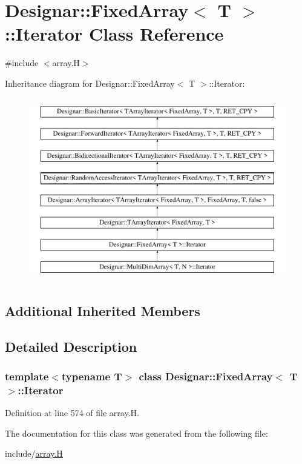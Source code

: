 \hypertarget{class_designar_1_1_fixed_array_1_1_iterator}{}\section{Designar\+:\+:Fixed\+Array$<$ T $>$\+:\+:Iterator Class Reference}
\label{class_designar_1_1_fixed_array_1_1_iterator}


{\ttfamily \#include $<$array.\+H$>$}

Inheritance diagram for Designar\+:\+:Fixed\+Array$<$ T $>$\+:\+:Iterator\+:\begin{figure}[H]
\begin{center}
\leavevmode
\includegraphics[height=8.000000cm]{class_designar_1_1_fixed_array_1_1_iterator}
\end{center}
\end{figure}
\subsection*{Additional Inherited Members}


\subsection{Detailed Description}
\subsubsection*{template$<$typename T$>$\newline
class Designar\+::\+Fixed\+Array$<$ T $>$\+::\+Iterator}



Definition at line 574 of file array.\+H.



The documentation for this class was generated from the following file\+:\begin{DoxyCompactItemize}
\item 
include/\hyperlink{array_8_h}{array.\+H}\end{DoxyCompactItemize}
